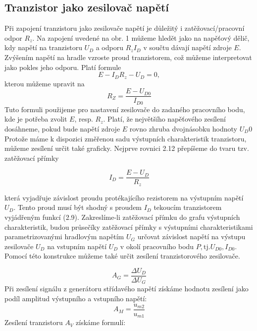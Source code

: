 \documentclass[czech,11pt,a4paper]{article}
\begin{document}
\begin{multicols}{2}
\begin{figure}[H]
	\end{figure} 
	\subsection{Tranzistor jako zesilovač napětí}
	Při zapojení tranzistoru jako zesilovače napětí je důležitý i zatěžovací/pracovní odpor $R_z$. Na zapojení uvedené na obr. 1 můžeme hledět jako na napěťový dělič, kdy napětí na tranzistoru $U_D$ a odporu $R_zI_D$ v součtu dávají napětí zdroje $E$. Zvýšením napětí na hradle vzroste proud tranzistorem, což můžeme interpretovat jako pokles jeho odporu. 
	Platí formule
	\begin{equation}
		E-I_DR_z-U_D = 0,
	\end{equation}
	kterou můžeme upravit na
	\begin{equation}
		R_Z = \frac{E-U_{D0}}{I_{D0}}
	\end{equation}
	Tuto formuli použijeme pro nastavení zesilovače do zadaného pracovního bodu, kde je potřeba zvolit $E$, resp. $R_z$. Platí, že největšího napěťového zesílení dosáhneme, pokud bude napětí zdroje $E$ rovno zhruba dvojnásobku hodnoty $U_D0$
	Protože máme k dispozici změřenou sadu výstupních charakteristik tranzistoru, můžeme zesílení určit také graficky. Nejprve rovnici 2.12 přepíšeme do tvaru tzv. zatěžovací přímky
	
	\begin{equation}
		I_{D}=\frac{E-U_{D}}{R_{z}}
	\end{equation}
	
	která vyjadřuje závislost proudu protékajícího rezistorem na výstupním napětí $U_{D}$. Tento proud musí být shodný s proudem $I_{D}$ tekoucím tranzistorem vyjádřeným funkcí (2.9). Zakreslíme-li zatěžovací přímku do grafu výstupních charakteristik, budou průsečíky zatěžovací přímky s výstupními charakteristikami parametrizovanými hradlovým napětím $U_{G}$ určovat závislost napětí na výstupu zesilovače $U_{D}$ na vstupním napětí $U_{D}$ v okolí pracovního bodu $P, \mathrm{tj} . U_{D 0}, I_{D 0}$. Pomocí této konstrukce můžeme také určit zesílení tranzistorového zesilovače.
	
	\begin{equation}
		A_{G}=\frac{\Delta U_{D}}{\Delta U_{G}} 
	\end{equation}
  	Při zesílení signálu z generátoru střídavého napětí získáme hodnotu zesílení jako podíl amplitud výstupního a vstupního napětí:
  	\begin{equation}
  		A_M = \frac{u_{m2}}{u_{m1}}
  	\end{equation}
  	Zesílení tranzistoru $A_V$ získáme formulí:
  	

\end{multicols}
\end{document}

